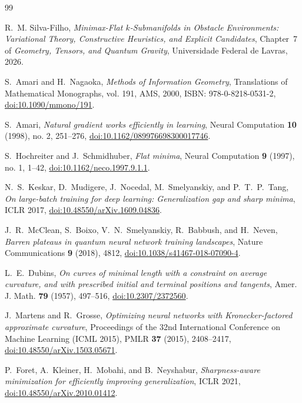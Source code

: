 \documentclass[11pt,reqno]{amsart}
\theoremstyle{definition}
\numberwithin{equation}{section}
\begin{document}
\begin{thebibliography}{99}

 R.~M. Silva-Filho, \emph{Minimax-Flat $k$-Submanifolds in Obstacle Environments: Variational Theory, Constructive Heuristics, and Explicit Candidates}, Chapter~7 of \emph{Geometry, Tensors, and Quantum Gravity}, Universidade Federal de Lavras, 2026.

S.~Amari and H.~Nagaoka,
\emph{Methods of Information Geometry},
Translations of Mathematical Monographs, vol. 191, AMS, 2000, ISBN: 978-0-8218-0531-2, \href{https://doi.org/10.1090/mmono/191}{doi:10.1090/mmono/191}.

S.~Amari,
\emph{Natural gradient works efficiently in learning},
Neural Computation \textbf{10} (1998), no. 2, 251--276, \href{https://doi.org/10.1162/089976698300017746}{doi:10.1162/089976698300017746}.

S.~Hochreiter and J.~Schmidhuber,
\emph{Flat minima},
Neural Computation \textbf{9} (1997), no. 1, 1--42, \href{https://doi.org/10.1162/neco.1997.9.1.1}{doi:10.1162/neco.1997.9.1.1}.

N.~S.~Keskar, D.~Mudigere, J.~Nocedal, M.~Smelyanskiy, and P.~T.~P.~Tang,
\emph{On large-batch training for deep learning: Generalization gap and sharp minima},
ICLR 2017, \href{https://doi.org/10.48550/arXiv.1609.04836}{doi:10.48550/arXiv.1609.04836}.

J.~R.~McClean, S.~Boixo, V.~N.~Smelyanskiy, R.~Babbush, and H.~Neven,
\emph{Barren plateaus in quantum neural network training landscapes},
Nature Communications \textbf{9} (2018), 4812, \href{https://doi.org/10.1038/s41467-018-07090-4}{doi:10.1038/s41467-018-07090-4}.

L.~E.~Dubins,
\emph{On curves of minimal length with a constraint on average curvature, and with prescribed initial and terminal positions and tangents},
Amer. J. Math. \textbf{79} (1957), 497--516, \href{https://doi.org/10.2307/2372560}{doi:10.2307/2372560}.

J.~Martens and R.~Grosse,
\emph{Optimizing neural networks with Kronecker-factored approximate curvature},
Proceedings of the 32nd International Conference on Machine Learning (ICML 2015), PMLR \textbf{37} (2015), 2408--2417,
\href{https://doi.org/10.48550/arXiv.1503.05671}{doi:10.48550/arXiv.1503.05671}.

P.~Foret, A.~Kleiner, H.~Mobahi, and B.~Neyshabur,
\emph{Sharpness-aware minimization for efficiently improving generalization},
ICLR 2021, \href{https://doi.org/10.48550/arXiv.2010.01412}{doi:10.48550/arXiv.2010.01412}.


\end{thebibliography}
\end{document}
